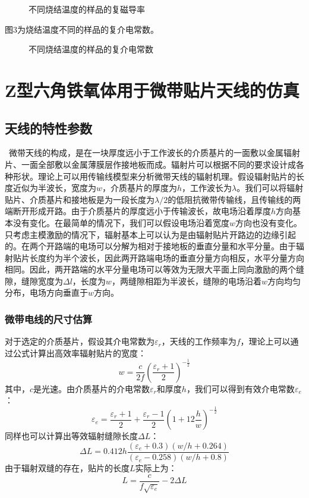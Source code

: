 \documentclass{article}
\begin{document}
\begin{figure}[h]
  \resizebox{25em}{!}{\texttt{[image: ]}}
  
  \resizebox{25em}{!}{\texttt{[image: ]}}
  \caption{不同烧结温度的样品的复磁导率}
\end{figure}

图3为烧结温度不同的样品的复介电常数。

\begin{figure}[h]
  \resizebox{25em}{!}{\texttt{[image: ]}}
  
  \resizebox{25em}{!}{\texttt{[image: ]}}
  \caption{不同烧结温度的样品的复介电常数}
\end{figure}



\section{Z型六角铁氧体用于微带贴片天线的仿真}

\subsection{天线的特性参数}

\
微带天线的构成，是在一块厚度远小于工作波长的介质基片的一面敷以金属辐射片、一面全部敷以金属薄膜层作接地板而成。辐射片可以根据不同的要求设计成各种形状。理论上可以用传输线模型来分析微带天线的辐射机理。假设辐射贴片的长度近似为半波长，宽度为$w$，介质基片的厚度为$h$，工作波长为$\lambda$。我们可以将辐射贴片、介质基片和接地板是为一段长度为$\lambda
/
2$的低阻抗微带传输线，且传输线的两端断开形成开路。由于介质基片的厚度远小于传输波长，故电场沿着厚度$h$方向基本没有变化。在最简单的情况下，我们可以假设电场沿着宽度$w$方向也没有变化。只考虑主模激励的情况下，辐射基本上可以认为是由辐射贴片开路边的边缘引起的。在两个开路端的电场可以分解为相对于接地板的垂直分量和水平分量。由于辐射贴片长度约为半个波长，因此两开路端电场的垂直分量方向相反，水平分量方向相同。因此，两开路端的水平分量电场可以等效为无限大平面上同向激励的两个缝隙，缝隙宽度为$\Delta
l$，长度为$w$，两缝隙相距为半波长，缝隙的电场沿着$w$方向均匀分布，电场方向垂直于$w$方向。

\subsubsection{微带电线的尺寸估算}

对于选定的介质基片，假设其介电常数为$\varepsilon_r$，天线的工作频率为$f$，理论上可以通过公式计算出高效率辐射贴片的宽度：
\[ w = \frac{c}{2 f} \left( \frac{\varepsilon_r + 1}{2} \right)^{-
   \frac{1}{2}} \]
其中，$c$是光速。由介质基片的介电常数$\varepsilon_r$和厚度$h$，我们可以得到有效介电常数$\varepsilon_e$：
\[ \varepsilon_e = \frac{\varepsilon_r + 1}{2} + \frac{\varepsilon_r - 1}{2}
   \left( 1 + 12 \frac{h}{w} \right)^{- \frac{1}{2}} \]
同样也可以计算出等效辐射缝隙长度$\Delta L$：
\[ \Delta L = 0.412 h \frac{\left( \varepsilon_e + 0.3 \right) \left( w / h +
   0.264 \right)}{\left( \varepsilon_e - 0.258 \right) \left( w / h + 0.8
   \right)} \]
由于辐射双缝的存在，贴片的长度$L$实际上为：
\[ L = \frac{c}{f \sqrt{\varepsilon_e}} - 2 \Delta L \]
\end{document}
